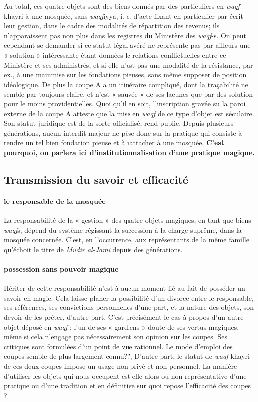 Au total, ces quatre objets sont des biens donnés par des particuliers
en \textit{waqf} khayri à une mosquée, sans \textit{waqf}iyya, i. e. d'acte fixant en particulier par écrit leur gestion, dans le cadre des modalités de répartition des revenus; ils n'apparaissent pas non plus dans les registres du Ministère des \textit{waqf}-s. On peut cependant se demander si ce statut légal avéré ne représente pas par ailleurs une « solution » intéressante étant données le relations conflictuelles entre ce Ministère et ses administrés, et si elle n'est pas une modalité de la résistance, par ex., à une mainmise sur les fondations pieuses, sans même supposer de position idéologique. De plus la coupe A a un itinéraire compliqué, dont la traçabilité ne semble par toujours claire, et n'est « sauvée » de ses lacunes que par des solution pour le moins providentielles. Quoi qu'il en soit, l'inscription gravée su la paroi externe de la coupe A atteste que la mise en \textit{waqf} de ce type d'objet est séculaire. Son statut juridique est de la sorte officialisé, rend public. Depuis plusieurs générations, aucun interdit majeur ne pèse donc sur la pratique qui consiste à rendre un tel bien fondation pieuse et à rattacher à une mosquée. \textbf{C'est pourquoi, on parlera ici d'institutionnalisation d'une pratique magique.}

\subsection{Transmission du savoir et efficacité }

\paragraph{le responsable de la mosquée}
La responsabilité de la « gestion » des quatre objets magiques, en tant que biens \textit{waqf}s, dépend du système régissant la succession à la charge suprême, dans la mosquée concernée. C'est, en l'occurrence, aux représentants de la même famille qu'échoit le titre de \textit{Mudir al-Jami} depuis des générations. 
\paragraph{possession sans pouvoir magique}
Hériter de cette responsabilité n'est à aucun moment lié au fait de posséder un savoir en magie. Cela laisse planer la possibilité d'un divorce entre le responsable, ses références, ses convictions personnelles d'une part, et la nature des objets, son devoir de les prêter, d'autre part.
C'est précisément le cas à propos d'un autre objet déposé en \textit{waqf} : l'un de ses « gardiens » doute de ses vertus magiques, même si cela n'engage pas nécessairement son opinion sur les coupes. Ses critiques sont formulées d'un point de vue rationnel. Le mode d'emploi des coupes semble de plus largement connu??, D'autre part, le statut de \textit{waqf} khayri de ces deux coupes impose un usage non privé et non personnel. La manière d'utiliser les objets qui nous occupent est-elle alors ou non représentative d'une pratique ou d'une tradition et en définitive sur quoi repose l'efficacité des coupes ?
